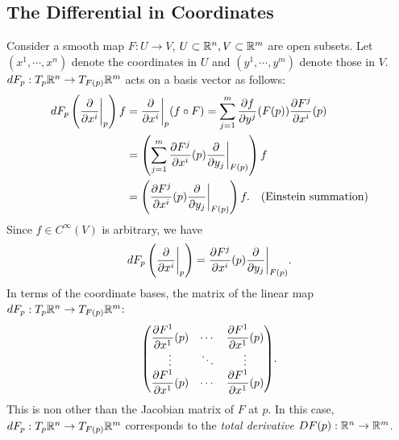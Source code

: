 \subsection{The Differential in Coordinates}
Consider a smooth map $F:U \to V$, $U \subset \mathbb{R}^n, V \subset \mathbb{R}^m$ are open 
subsets. Let $(x^1, \cdots, x^n)$ denote the coordinates in $U$ and $(y^1, \cdots, y^m)$ denote those in $V$. 
$dF_p: T_p\mathbb{R}^n \to T_{F(p)}\mathbb{R}^m$ acts on a basis vector as follows:
\begin{align*}
    dF_p \left(\pdv{}{x^i}\bigg|_p\right)f
    &= \pdv{}{x^i}\bigg|_p (f \circ F) = \sum_{j=1}^{m}{\pdv{f}{y^j}}(F(p)){\pdv{F^j}{x^i}}(p) \\
    &= \left(\sum_{j=1}^{m}{\pdv{F^j}{x^i}}(p) \pdv{}{y_j}\bigg|_{F(p)} \right)f \\
    &= \left({\pdv{F^j}{x^i}}(p) \pdv{}{y_j}\bigg|_{F(p)}\right) f.
    \quad (\text{Einstein summation})
\end{align*}
Since $f \in C^\infty(V)$ is arbitrary, we have 
\begin{equation}\label{Lee3.9}
    dF_p \left(\pdv{}{x^i}\bigg|_p\right) = {\pdv{F^j}{x^i}}(p) \pdv{}{y_j}\bigg|_{F(p)}.
\end{equation}
In terms of the coordinate bases, the matrix of the linear map $dF_p:T_p\mathbb{R}^n \to T_{F(p)}\mathbb{R}^m$:
$$ {\everymath{\displaystyle}
   \begin{pmatrix} 
    {\pdv{F^1}{x^1}}(p) & \cdots & {\pdv{F^1}{x^1}}(p) \\
    \vdots              & \ddots & \vdots              \\
    {\pdv{F^1}{x^1}}(p) & \cdots & {\pdv{F^1}{x^1}}(p) 
   \end{pmatrix}}. $$
This is non other than the Jacobian matrix of $F$ at $p$. In this case, $dF_p: T_p\mathbb{R}^n \to T_{F(p)}\mathbb{R}^m$ corresponds to the \textit{total derivative} $DF(p): \mathbb{R}^n \to \mathbb{R}^m$. 

